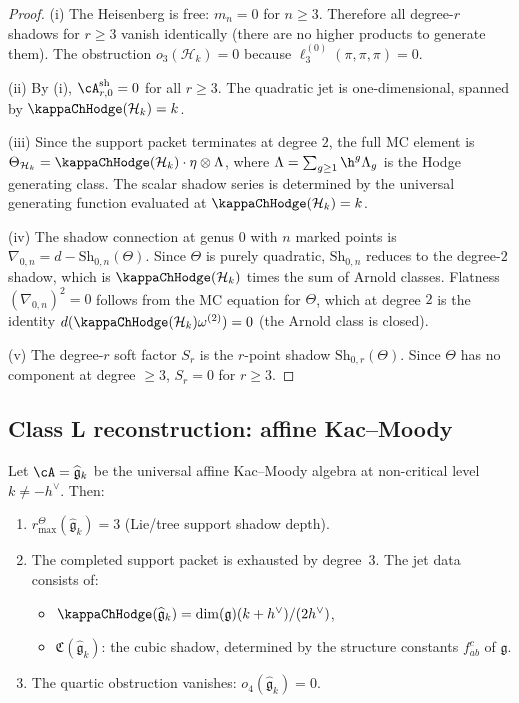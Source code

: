 \begin{proof}
(i) The Heisenberg is free: $m_n = 0$ for $n \geq 3$. Therefore all degree-$r$ shadows
for $r \geq 3$ vanish identically (there are no higher products to generate them). The
obstruction $o_3(\mathcal{H}_k) = 0$ because $\ell_3^{(0)}(\pi, \pi, \pi) = 0$.

(ii) By (i), $\cA^{\mathrm{sh}}_{r,0} = 0$ for all $r \geq 3$. The quadratic jet is
one-dimensional, spanned by \(\kappaChHodge(\mathcal H_k)=k\).

(iii) Since the support packet terminates at degree $2$, the full MC element is
\(\Theta_{\mathcal{H}_k} =
\kappaChHodge(\mathcal H_k) \cdot \eta \otimes \Lambda\), where
$\Lambda = \sum_{g \geq 1} \h^g \Lambda_g$ is the Hodge generating class. The
scalar shadow series is determined by the universal generating function
evaluated at \(\kappaChHodge(\mathcal H_k)=k\).

(iv) The shadow connection at genus $0$ with $n$ marked points is
$\nabla_{0,n} = d - \mathrm{Sh}_{0,n}(\Theta)$. Since $\Theta$ is purely quadratic,
$\mathrm{Sh}_{0,n}$ reduces to the degree-$2$ shadow, which is
\(\kappaChHodge(\mathcal H_k)\) times the
sum of Arnold classes. Flatness $(\nabla_{0,n})^2 = 0$ follows from the MC equation
for $\Theta$, which at degree $2$ is the identity
\(d(\kappaChHodge(\mathcal H_k)\omega^{(2)}) = 0\) (the
Arnold class is closed).

(v) The degree-$r$ soft factor $S_r$ is the $r$-point shadow
$\mathrm{Sh}_{0,r}(\Theta)$. Since $\Theta$ has no component at degree $\geq 3$,
$S_r = 0$ for $r \geq 3$.
\end{proof}

\subsection{Class L reconstruction: affine Kac--Moody}

\begin{theorem}
\label{thm:class-l-reconstruction}
Let $\cA = \widehat{\mathfrak{g}}_k$ be the universal affine Kac--Moody algebra at
non-critical level $k \neq -h^\vee$. Then:
\begin{enumerate}[label=\textup{(\roman*)}]
\item \(r^\Theta_{\max}(\widehat{\mathfrak{g}}_k) = 3\) (Lie/tree support shadow depth).
\item The completed support packet is exhausted by degree~$3$. The jet data
 consists of:
 \begin{itemize}
 \item $\kappaChHodge(\widehat{\mathfrak{g}}_k) = \dim(\mathfrak{g})(k + h^\vee)/(2h^\vee)$,
 \item $\mathfrak{C}(\widehat{\mathfrak{g}}_k)$: the cubic shadow, determined by the
 structure constants $f^c_{ab}$ of $\mathfrak{g}$.
 \end{itemize}
\item The quartic obstruction vanishes: $o_4(\widehat{\mathfrak{g}}_k) = 0$.
\end{enumerate}
\end{theorem}

